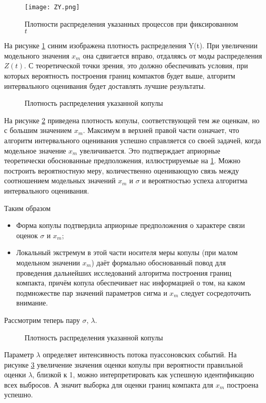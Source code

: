 \begin{figure}[H]
	\centering
	\texttt{[image: ZY.png]}
	\caption{Плотности распределения указанных процессов при фиксированном $t$}
	\label{fig:zy}
\end{figure}
На рисунке \ref{fig:zy} синим изображена плотность распределения Y(t). При увеличении модельного значения $x_m$ она сдвигается вправо, отдаляясь от моды распределения $Z(t)$. С теоретической точки зрения, это должно обеспечивать условия, при которых вероятность построения границ компактов будет выше, алгоритм интервального оценивания будет доставлять лучшие результаты.

\begin{figure}[H]
	{}
	\caption{Плотность распределения указанной копулы}
	\label{fig:bigxm}
\end{figure}
На рисунке \ref{fig:bigxm} приведена плотность копулы, соответствующей тем же оценкам, но с большим значением $x_m$. Максимум в верхней правой части означает, что алгоритм интервального оценивания успешно справляется со своей задачей, когда модельное значение $x_m$ увеличивается. Это подтверждает априорные теоретически обоснованные предположения, иллюстрируемые на \ref{fig:zy}. Можно построить вероятностную меру, количественно оценивающую связь между соотношением  модельных значений $x_m$ и $\sigma$ и вероятностью успеха  алгоритма интервального оценивания.

Таким образом
\begin{itemize}
  \item Форма копулы подтвердила априорные предположения о характере связи оценок $\sigma$ и $x_m$;
  \item Локальный экстремум в этой части носителя меры копулы  (при малом модельном значении $x_m$) даёт формально обоснованный повод для проведения дальнейших исследований алгоритма построения границ компакта, причём копула обеспечивает нас информацией о том, на каком подмножестве пар значений параметров сигма и $x_m$ следует сосредоточить внимание.
\end{itemize}

Рассмотрим теперь пару $\sigma$, $\lambda$.
\begin{figure}[H]
	{}
	\caption{Плотность распределения указанной копулы}
	\label{fig:smalllambda}
\end{figure}
Параметр $\lambda$ определяет интенсивность потока пуассоновских событий. На рисунке \ref{fig:smalllambda} увеличение значения оценки копулы при вероятности правильной оценки $\lambda$, близкой к 1, можно интерпретировать как успешную идентификацию всех выбросов. А значит выборка для оценки границ компакта для $x_m$ построена успешно.

